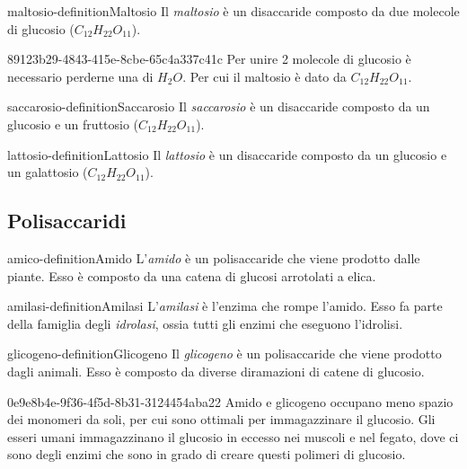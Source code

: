 \documentclass[preview]{standalone}
\begin{document}
\begin{snippetdefinition}{maltosio-definition}{Maltosio}
    Il \textit{maltosio} è un disaccaride composto da due molecole di glucosio (\(C_{12}H_{22}O_{11}\)).
\end{snippetdefinition}

\begin{snippet}{89123b29-4843-415e-8cbe-65c4a337c41c}
    Per unire 2 molecole di glucosio è necessario perderne una di \(H_2O\).
    Per cui il maltosio è dato da \(C_{12}H_{22}O_{11}\).
\end{snippet}

\begin{snippetdefinition}{saccarosio-definition}{Saccarosio}
    Il \textit{saccarosio} è un disaccaride composto da un glucosio e un fruttosio (\(C_{12}H_{22}O_{11}\)).
\end{snippetdefinition}

\begin{snippetdefinition}{lattosio-definition}{Lattosio}
    Il \textit{lattosio} è un disaccaride composto da un glucosio e un galattosio (\(C_{12}H_{22}O_{11}\)).
\end{snippetdefinition}

\subsection{Polisaccaridi}

\begin{snippetdefinition}{amico-definition}{Amido}
    L'\textit{amido} è un polisaccaride che viene prodotto dalle piante. 
    Esso è composto da una catena di glucosi arrotolati a elica.
\end{snippetdefinition}

\begin{snippetdefinition}{amilasi-definition}{Amilasi}
    L'\textit{amilasi} è l'enzima che rompe l'amido.
    Esso fa parte della famiglia degli \textit{idrolasi}, ossia tutti gli enzimi che
    eseguono l'idrolisi.
\end{snippetdefinition}

\begin{snippetdefinition}{glicogeno-definition}{Glicogeno}
    Il \textit{glicogeno} è un polisaccaride che viene prodotto dagli animali.
    Esso è composto da diverse diramazioni di catene di glucosio.
\end{snippetdefinition}

\begin{snippet}{0e9e8b4e-9f36-4f5d-8b31-3124454aba22}
    Amido e glicogeno occupano meno spazio dei monomeri da soli, per cui sono ottimali per immagazzinare
    il glucosio.
    Gli esseri umani immagazzinano il glucosio in eccesso nei muscoli e nel fegato, dove ci sono degli enzimi
    che sono in grado di creare questi polimeri di glucosio.
\end{snippet}
\end{document}
